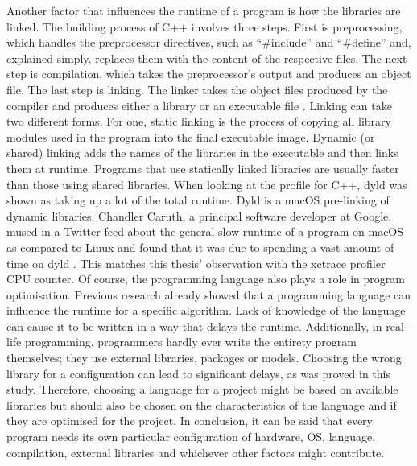 Another factor that influences the runtime of a program is how the libraries are linked. The building process of C++ involves three steps. First is preprocessing, which handles the preprocessor directives, such as “\#include” and “\#define” and, explained simply, replaces them with the content of the respective files. The next step is compilation, which takes the preprocessor’s output and produces an object file. The last step is linking. The linker takes the object files produced by the compiler and produces either a library or an executable file \cite{linking}. Linking can take two different forms. For one, static linking is the process of copying all library modules used in the program into the final executable image. Dynamic (or shared) linking adds the names of the libraries in the executable and then links them at runtime. Programs that use statically linked libraries are usually faster than those using shared libraries. When looking at the profile for C++, dyld was shown as taking up a lot of the total runtime. Dyld is a macOS pre-linking of dynamic libraries. Chandler Caruth, a principal software developer at Google, mused in a Twitter feed about the general slow runtime of a program on macOS as compared to Linux and found that it was due to spending a vast amount of time on dyld \cite{twitter}. This matches this thesis' observation with the xctrace profiler CPU counter.
Of course, the programming language also plays a role in program optimisation. Previous research already showed that a programming language can influence the runtime for a specific algorithm. Lack of knowledge of the language can cause it to be written in a way that delays the runtime. Additionally, in real-life programming, programmers hardly ever write the entirety program themselves; they use external libraries, packages or models. Choosing the wrong library for a configuration can lead to significant delays, as was proved in this study. Therefore, choosing a language for a project might be based on available libraries but should also be chosen on the characteristics of the language and if they are optimised for the project. In conclusion, it can be said that every program needs its own particular configuration of hardware, OS, language, compilation, external libraries and whichever other factors might contribute.
